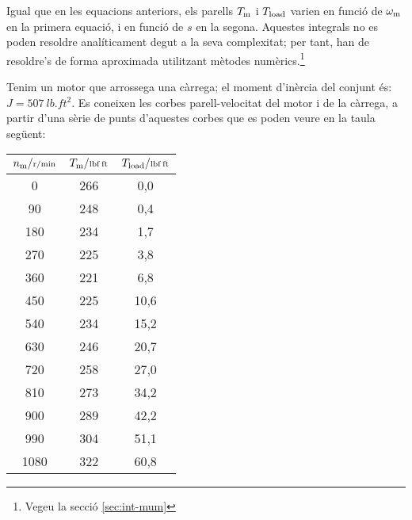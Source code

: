 Igual que en les equacions anteriors, els parells $T_\mathrm{m}$ i $T_\mathrm{load}$ varien en funció de $\omega_\mathrm{m}$ en la primera equació, i en funció de $s$ en la segona. Aquestes integrals no es poden  resoldre  analíticament degut a la seva complexitat; per tant,  han de resoldre's de forma aproximada utilitzant mètodes numèrics.\footnote{Vegeu la secció \ref{sec:int-mum}}


\begin{exemple}\label{ex:MotTempsArr}
	\addcontentsxms{\MotTempsArr}
Tenim un motor que arrossega una càrrega; el moment d'inèrcia del conjunt és: $J = \qty{507}{lb.ft^2}$. Es coneixen les corbes parell-velocitat del motor i de la càrrega, a partir d'una sèrie de punts d'aquestes corbes que es poden veure en la taula següent:

\begin{center}
    \begin{tabular}{S[table-format=4.0]S[table-format=3.0]S[table-format=3.1]}
    \toprule[1pt]
    $n\ped{m}/{\scriptstyle \unit{r/min}}$ &  $T\ped{m}/{\scriptstyle \unit{lbf.ft}}$   & $T\ped{load}/{\scriptstyle \unit{lbf.ft}}$  \\
    	   &  266  &   0,0    \\
     90	   &  248  &   0,4    \\
     180   &  234  &   1,7    \\
     270   &  225  &   3,8    \\
     360   &  221  &   6,8    \\
     450   &  225  &   10,6   \\
     540   &  234  &   15,2   \\
     630   &  246  &   20,7   \\
     720   &  258  &   27,0   \\
     810   &  273  &   34,2   \\
     900   &  289  &   42,2   \\
     990   &  304  &   51,1   \\
     1080  &  322  &   60,8   \\
     \midrule
    \end{tabular}
\end{center}


\end{exemple}
